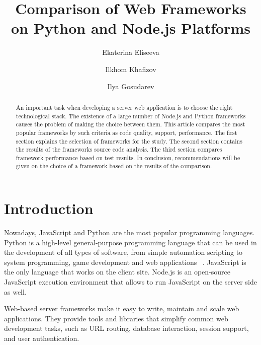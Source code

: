 \documentclass[runningheads]{llncs}
\begin{document}
%
\title{Comparison of Web Frameworks on Python and Node.js Platforms}
%
%
\author{Ekaterina Eliseeva \and
Ilkhom Khafizov \and
Ilya Gosudarev}
%
%
%
\maketitle              %
%
\begin{abstract}
An important task when developing a server web application is to choose the right technological stack. The existence of a large number of Node.js and Python frameworks causes the problem of making the choice between them. This article compares the most popular frameworks by such criteria as code quality, support, performance. The first section explains the selection of frameworks for the study. The second section contains the results of the frameworks source code analysis. The third section compares framework performance based on test results. In conclusion, recommendations will be given on the choice of a framework based on the results of the comparison.

\end{abstract}
%
%
%
\section{Introduction}
Nowadays, JavaScript and Python are the most popular programming languages. Python is a high-level general-purpose programming language that can be used in the development of all types of software, from simple automation scripting to system programming, game development and web applications ~\cite{ref_book1}. JavaScript is the only language that works on the client site. Node.js is an open-source JavaScript execution environment that allows to run JavaScript on the server side as well.

Web-based server frameworks make it easy to write, maintain and scale web applications. They provide tools and libraries that simplify common web development tasks, such as URL routing, database interaction, session support, and user authentication.
\end{document}
